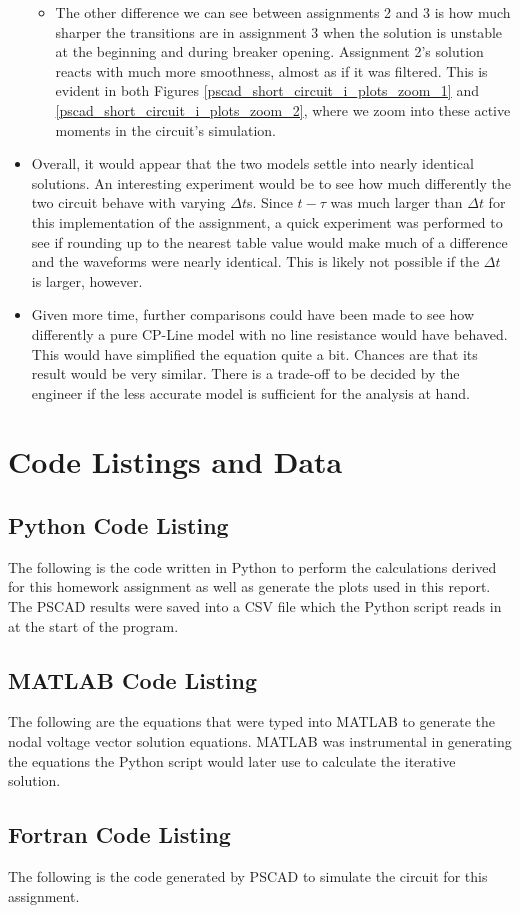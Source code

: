 \documentclass[10pt, oneside, letterpaper]{article}
\begin{document}
\begin{itemize}
\begin{itemize}
      \item The other difference we can see between assignments 2 and 3 is how much sharper the transitions are in assignment 3 when the solution is unstable at the beginning and during breaker opening. Assignment 2's solution reacts with much more smoothness, almost as if it was filtered. This is evident in both Figures \ref{pscad_short_circuit_i_plots_zoom_1} and \ref{pscad_short_circuit_i_plots_zoom_2}, where we zoom into these active moments in the circuit's simulation.
    \end{itemize}
    \item Overall, it would appear that the two models settle into nearly identical solutions. An interesting experiment would be to see how much differently the two circuit behave with varying $\Delta{}t$s. Since $t - \tau$ was much larger than $\Delta{}t$ for this implementation of the assignment, a quick experiment was performed to see if rounding up to the nearest table value would make much of a difference and the waveforms were nearly identical. This is likely not possible if the $\Delta{}t$ is larger, however.
    \item Given more time, further comparisons could have been made to see how differently a pure CP-Line model with no line resistance would have behaved. This would have simplified the equation quite a bit. Chances are that its result would be very similar. There is a trade-off to be decided by the engineer if the less accurate model is sufficient for the analysis at hand.
\end{itemize}

\newpage
\section{Code Listings and Data}

\subsection{Python Code Listing}
\label{code-listing-python}
The following is the code written in Python to perform the calculations derived for this homework assignment as well as generate the plots used in this report. The PSCAD results were saved into a CSV file which the Python script reads in at the start of the program.


\subsection{MATLAB Code Listing}
\label{code-listing-matlab}
The following are the equations that were typed into MATLAB to generate the nodal voltage vector solution equations. MATLAB was instrumental in generating the equations the Python script would later use to calculate the iterative solution.


\subsection{Fortran Code Listing}
\label{code-listing-fortran}
The following is the code generated by PSCAD to simulate the circuit for this assignment.

\end{document}
